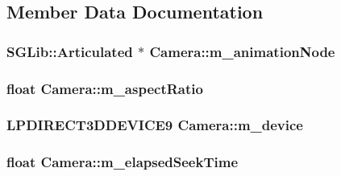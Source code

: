 \subsection{Member Data Documentation}
\hypertarget{class_feisty_1_1_camera_a3c97db1bade9711107fc3719fab4b9a7}{
\subsubsection[{m\_\-animationNode}]{\setlength{\rightskip}{0pt plus 5cm}SGLib::Articulated $\ast$ {\bf Camera::m\_\-animationNode}}}
\label{class_feisty_1_1_camera_a3c97db1bade9711107fc3719fab4b9a7}
\hypertarget{class_feisty_1_1_camera_a9a5b3abea53ca97854696258029ee6cd}{
\subsubsection[{m\_\-aspectRatio}]{\setlength{\rightskip}{0pt plus 5cm}float {\bf Camera::m\_\-aspectRatio}}}
\label{class_feisty_1_1_camera_a9a5b3abea53ca97854696258029ee6cd}
\hypertarget{class_feisty_1_1_camera_a97f0d0c8495ae47a9cb68eb0250e6fec}{
\subsubsection[{m\_\-device}]{\setlength{\rightskip}{0pt plus 5cm}LPDIRECT3DDEVICE9 {\bf Camera::m\_\-device}}}
\label{class_feisty_1_1_camera_a97f0d0c8495ae47a9cb68eb0250e6fec}
\hypertarget{class_feisty_1_1_camera_a6dfc75d25cfe092df8980d0182b05be0}{
\subsubsection[{m\_\-elapsedSeekTime}]{\setlength{\rightskip}{0pt plus 5cm}float {\bf Camera::m\_\-elapsedSeekTime}}}
